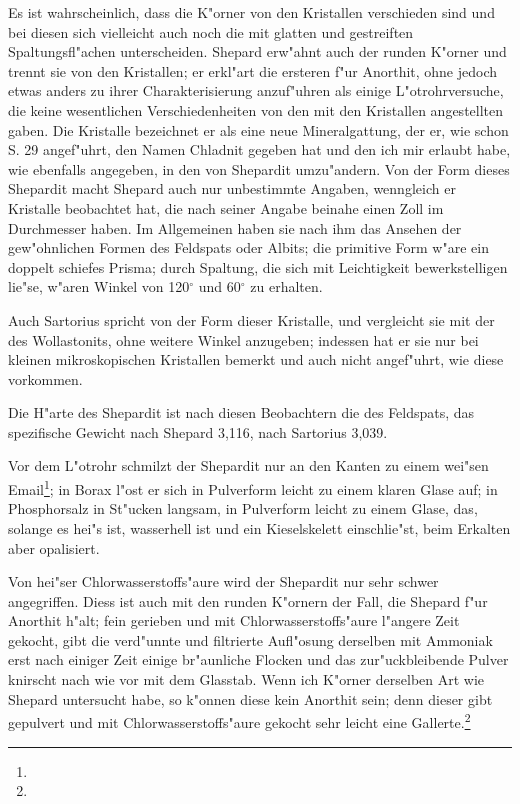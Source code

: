 \documentclass[a4paper, 11pt, oneside]{article}
\begin{document}
Es ist wahrscheinlich, dass die K"orner von den Kristallen verschieden sind und bei diesen sich vielleicht auch noch die mit glatten und gestreiften Spaltungsfl"achen unterscheiden. Shepard erw"ahnt auch der runden K"orner und trennt sie von den Kristallen; er erkl"art die ersteren f"ur Anorthit, ohne jedoch etwas anders zu ihrer Charakterisierung anzuf"uhren als einige L"otrohrversuche, die keine wesentlichen Verschiedenheiten von den mit den Kristallen angestellten gaben. Die Kristalle bezeichnet er als eine neue Mineralgattung, der er, wie schon S. 29 angef"uhrt, den Namen Chladnit gegeben hat und den ich mir erlaubt habe, wie ebenfalls angegeben, in den von Shepardit umzu"andern. Von der Form dieses Shepardit macht Shepard auch nur unbestimmte Angaben, wenngleich er Kristalle beobachtet hat, die nach seiner Angabe beinahe einen Zoll im Durchmesser haben. Im Allgemeinen haben sie nach ihm das Ansehen der gew"ohnlichen Formen des Feldspats oder Albits; die primitive Form w"are ein doppelt schiefes Prisma; durch Spaltung, die sich mit Leichtigkeit bewerkstelligen lie"se, w"aren Winkel von 120$^{\circ}$ und 60$^{\circ}$ zu erhalten.

Auch Sartorius spricht von der Form dieser Kristalle, und vergleicht sie mit der des Wollastonits, ohne weitere Winkel anzugeben; indessen hat er sie nur bei kleinen mikroskopischen Kristallen bemerkt und auch nicht angef"uhrt, wie diese vorkommen.

Die H"arte des Shepardit ist nach diesen Beobachtern die des Feldspats, das spezifische Gewicht nach Shepard 3,116, nach Sartorius 3,039.

Vor dem L"otrohr schmilzt der Shepardit nur an den Kanten zu einem wei"sen Email\footnote{}; in Borax l"ost er sich in Pulverform leicht zu einem klaren Glase auf; in Phosphorsalz in St"ucken langsam, in Pulverform leicht zu einem Glase, das, solange es hei"s ist, wasserhell ist und ein Kieselskelett einschlie"st, beim Erkalten aber opalisiert.

Von hei"ser Chlorwasserstoffs"aure wird der Shepardit nur sehr schwer angegriffen. Diess ist auch mit den runden K"ornern der Fall, die Shepard f"ur Anorthit h"alt; fein gerieben und mit Chlorwasserstoffs"aure l"angere Zeit gekocht, gibt die verd"unnte und filtrierte Aufl"osung derselben mit Ammoniak erst nach einiger Zeit einige br"aunliche Flocken und das zur"uckbleibende Pulver knirscht nach wie vor mit dem Glasstab. Wenn ich K"orner derselben Art wie Shepard untersucht habe, so k"onnen diese kein Anorthit sein; denn dieser gibt gepulvert und mit Chlorwasserstoffs"aure gekocht sehr leicht eine Gallerte.\footnote{}
\end{document}
